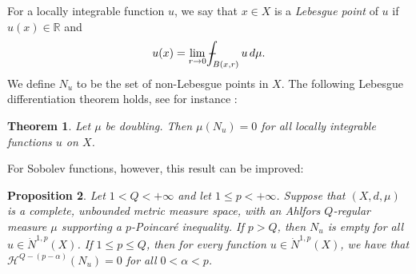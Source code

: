 \documentclass[10pt]{amsart}
\def\Xint#1{\mathchoice
	{\XXint\displaystyle\textstyle{#1}}
	{\XXint\textstyle\scriptstyle{#1}}
	{\XXint\scriptstyle\scriptscriptstyle{#1}}
	{\XXint\scriptscriptstyle\scriptscriptstyle{#1}}
	\!\int}
\def\XXint#1#2#3{{\setbox0=\hbox{$#1{#2#3}{\int}$ }
		\vcenter{\hbox{$#2#3$ }}\kern-.6\wd0}}
\def\dashint{\Xint-}
\newtheorem{theorem}{Theorem}[section]
\newtheorem{proposition}[theorem]{Proposition}
\numberwithin{equation}{section}
\begin{document}

For a locally integrable function $u$, we say that $x\in X$ is a \emph{Lebesgue point} of $u$ if $u(x)\in\mathbb R$ and 
\[
u(x)=\lim_{r\to 0}\dashint_{B(x,r)}u\,d\mu.
\]
We define $N_u$ to be the set of non-Lebesgue points in $X$.  The following Lebesgue differentiation theorem holds, see for instance \cite[Page 77]{pekka}:
 \begin{theorem}\label{thm2.3-2809}
 Let $\mu$ be doubling. Then $\mu(N_u)=0$ for all locally integrable functions $u$ on $X$.
 \end{theorem}

 For Sobolev functions, however, this result can be improved:
 

 \begin{proposition}\label{thm2.4-2809}  
 Let $1<Q<+\infty$ and let $1\le p<+\infty$.  Suppose that $(X,d,\mu)$ is a complete, unbounded metric measure space, with  an Ahlfors $Q$-regular measure $\mu$ supporting a $p$-Poincar\'e inequality. If $p>Q$, then $N_u$ is empty for all $u\in\dot N^{1,p}(X)$.  If $1\le p\le Q$, then for every function $u\in\dot N^{1,p}(X)$, we have that $\mathcal H^{Q-(p-\alpha)}(N_u)=0$ for all $0<\alpha<p$.
 \end{proposition}
 
\end{document}
